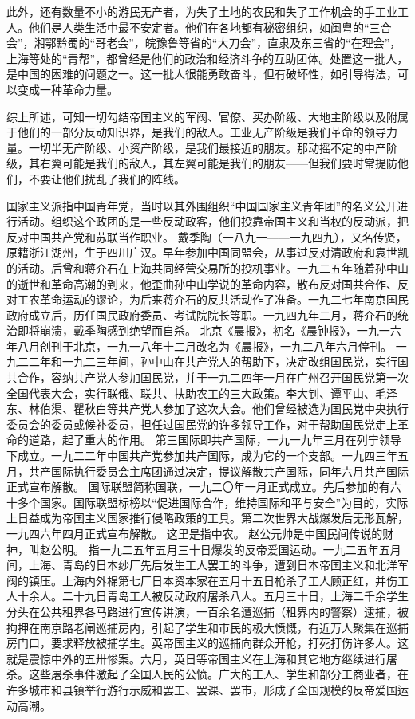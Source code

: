 此外，还有数量不小的游民无产者，为失了土地的农民和失了工作机会的手工业工人。他们是人类生活中最不安定者。他们在各地都有秘密组织，如闽粤的“三合会”，湘鄂黔蜀的“哥老会”，皖豫鲁等省的“大刀会”，直隶及东三省的“在理会”，上海等处的“青帮”，都曾经是他们的政治和经济斗争的互助团体。处置这一批人，是中国的困难的问题之一。这一批人很能勇敢奋斗，但有破坏性，如引导得法，可以变成一种革命力量。

综上所述，可知一切勾结帝国主义的军阀、官僚、买办阶级、大地主阶级以及附属于他们的一部分反动知识界，是我们的敌人。工业无产阶级是我们革命的领导力量。一切半无产阶级、小资产阶级，是我们最接近的朋友。那动摇不定的中产阶级，其右翼可能是我们的敌人，其左翼可能是我们的朋友——但我们要时常提防他们，不要让他们扰乱了我们的阵线。


\begin{maonote}
国家主义派指中国青年党，当时以其外围组织“中国国家主义青年团”的名义公开进行活动。组织这个政团的是一些反动政客，他们投靠帝国主义和当权的反动派，把反对中国共产党和苏联当作职业。
戴季陶（一八九一——一九四九），又名传贤，原籍浙江湖州，生于四川广汉。早年参加中国同盟会，从事过反对清政府和袁世凯的活动。后曾和蒋介石在上海共同经营交易所的投机事业。一九二五年随着孙中山的逝世和革命高潮的到来，他歪曲孙中山学说的革命内容，散布反对国共合作、反对工农革命运动的谬论，为后来蒋介石的反共活动作了准备。一九二七年南京国民政府成立后，历任国民政府委员、考试院院长等职。一九四九年二月，蒋介石的统治即将崩溃，戴季陶感到绝望而自杀。
北京《晨报》，初名《晨钟报》，一九一六年八月创刊于北京，一九一八年十二月改名为《晨报》，一九二八年六月停刊。
一九二二年和一九二三年间，孙中山在共产党人的帮助下，决定改组国民党，实行国共合作，容纳共产党人参加国民党，并于一九二四年一月在广州召开国民党第一次全国代表大会，实行联俄、联共、扶助农工的三大政策。李大钊、谭平山、毛泽东、林伯渠、瞿秋白等共产党人参加了这次大会。他们曾经被选为国民党中央执行委员会的委员或候补委员，担任过国民党的许多领导工作，对于帮助国民党走上革命的道路，起了重大的作用。
第三国际即共产国际，一九一九年三月在列宁领导下成立。一九二二年中国共产党参加共产国际，成为它的一个支部。一九四三年五月，共产国际执行委员会主席团通过决定，提议解散共产国际，同年六月共产国际正式宣布解散。
国际联盟简称国联，一九二〇年一月正式成立。先后参加的有六十多个国家。国际联盟标榜以“促进国际合作，维持国际和平与安全”为目的，实际上日益成为帝国主义国家推行侵略政策的工具。第二次世界大战爆发后无形瓦解，一九四六年四月正式宣布解散。
这里是指中农。
赵公元帅是中国民间传说的财神，叫赵公明。
指一九二五年五月三十日爆发的反帝爱国运动。一九二五年五月间，上海、青岛的日本纱厂先后发生工人罢工的斗争，遭到日本帝国主义和北洋军阀的镇压。上海内外棉第七厂日本资本家在五月十五日枪杀了工人顾正红，并伤工人十余人。二十九日青岛工人被反动政府屠杀八人。五月三十日，上海二千余学生分头在公共租界各马路进行宣传讲演，一百余名遭巡捕（租界内的警察）逮捕，被拘押在南京路老闸巡捕房内，引起了学生和市民的极大愤慨，有近万人聚集在巡捕房门口，要求释放被捕学生。英帝国主义的巡捕向群众开枪，打死打伤许多人。这就是震惊中外的五卅惨案。六月，英日等帝国主义在上海和其它地方继续进行屠杀。这些屠杀事件激起了全国人民的公愤。广大的工人、学生和部分工商业者，在许多城市和县镇举行游行示威和罢工、罢课、罢市，形成了全国规模的反帝爱国运动高潮。

\end{maonote}
